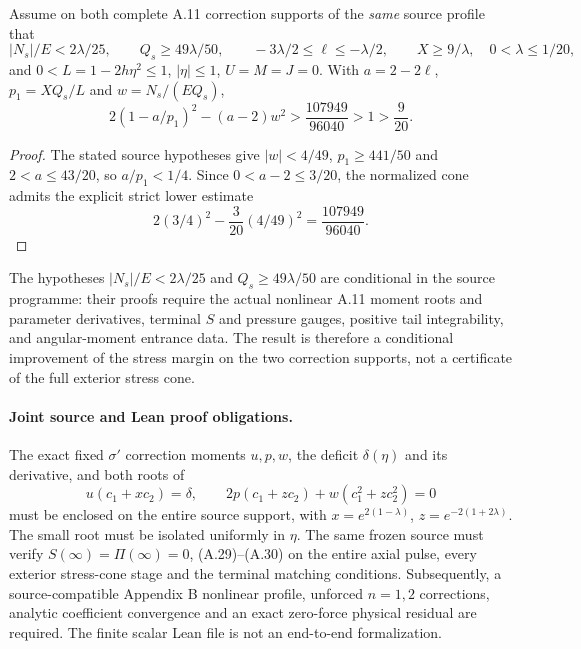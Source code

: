 \begin{proposition}
\label{prop:a11-joint-cone}
Assume on both complete A.11 correction supports of the \emph{same}
source profile that
\[
|N_s|/E<2\lambda/25,\qquad
Q_s\ge49\lambda/50,\qquad
-3\lambda/2\le\ell\le-\lambda/2,\qquad
X\ge9/\lambda,
\quad0<\lambda\le1/20,
\]
and $0<L=1-2h\eta^2\le1$, $|\eta|\le1$, $U=M=J=0$.
With $a=2-2\ell$, $p_1=XQ_s/L$ and $w=N_s/(EQ_s)$,
\[
2(1-a/p_1)^2-(a-2)w^2>
\frac{107949}{96040}>1>\frac9{20}.
\]
\end{proposition}
\begin{proof}
The stated source hypotheses give $|w|<4/49$,
$p_1\ge441/50$ and $2<a\le43/20$, so $a/p_1<1/4$.
Since $0<a-2\le3/20$, the normalized cone admits the explicit strict lower estimate
\[
2(3/4)^2-\frac3{20}(4/49)^2=\frac{107949}{96040}.
\]
\end{proof}
The hypotheses $|N_s|/E<2\lambda/25$ and
$Q_s\ge49\lambda/50$ are conditional in the source programme:
their proofs require the actual nonlinear A.11 moment roots and
parameter derivatives, terminal $S$ and pressure gauges,
positive tail integrability, and angular-moment entrance data.
The result is therefore a conditional improvement of the stress
margin on the two correction supports, not a certificate of the
full exterior stress cone.

\paragraph{Joint source and Lean proof obligations.}
The exact fixed $\sigma'$ correction moments $u,p,w$,
the deficit $\delta(\eta)$ and its derivative, and both roots
of
\[
u(c_1+xc_2)=\delta,\qquad
2p(c_1+zc_2)+w(c_1^2+zc_2^2)=0
\]
must be enclosed on the entire source support, with
$x=e^{2(1-\lambda)}$, $z=e^{-2(1+2\lambda)}$.
The small root must be isolated uniformly in $\eta$.
The same frozen source must verify $S(\infty)=\Pi(\infty)=0$,
(A.29)--(A.30) on the entire axial pulse, every exterior
stress-cone stage and the terminal matching conditions.
Subsequently, a source-compatible Appendix B nonlinear profile,
unforced $n=1,2$ corrections, analytic coefficient convergence
and an exact zero-force physical residual are required.
The finite scalar Lean file is not an end-to-end formalization.
